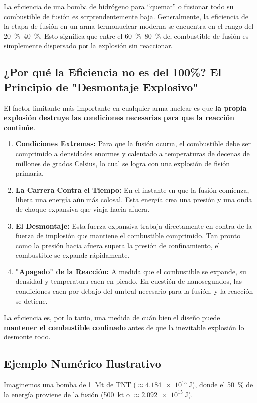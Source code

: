 \documentclass[11pt,a4paper]{book}
\begin{document}
La eficiencia de una bomba de hidrógeno para ``quemar'' o fusionar todo su combustible de fusión es sorprendentemente baja. Generalmente, la eficiencia de la etapa de fusión en un arma termonuclear moderna se encuentra en el rango del \SIrange{20}{40}{\percent}. Esto significa que entre el \SIrange{60}{80}{\percent} del combustible de fusión es simplemente dispersado por la explosión sin reaccionar.

\subsection*{¿Por qué la Eficiencia no es del 100\%? El Principio de "Desmontaje Explosivo"}

El factor limitante más importante en cualquier arma nuclear es que \textbf{la propia explosión destruye las condiciones necesarias para que la reacción continúe}.
\begin{enumerate}
    \item \textbf{Condiciones Extremas:} Para que la fusión ocurra, el combustible debe ser comprimido a densidades enormes y calentado a temperaturas de decenas de millones de grados Celsius, lo cual se logra con una explosión de fisión primaria.
    \item \textbf{La Carrera Contra el Tiempo:} En el instante en que la fusión comienza, libera una energía aún más colosal. Esta energía crea una presión y una onda de choque expansiva que viaja hacia afuera.
    \item \textbf{El Desmontaje:} Esta fuerza expansiva trabaja directamente en contra de la fuerza de implosión que mantiene el combustible comprimido. Tan pronto como la presión hacia afuera supera la presión de confinamiento, el combustible se expande rápidamente.
    \item \textbf{"Apagado" de la Reacción:} A medida que el combustible se expande, su densidad y temperatura caen en picado. En cuestión de nanosegundos, las condiciones caen por debajo del umbral necesario para la fusión, y la reacción se detiene.
\end{enumerate}
La eficiencia es, por lo tanto, una medida de cuán bien el diseño puede \textbf{mantener el combustible confinado} antes de que la inevitable explosión lo desmonte todo.

\subsection*{Ejemplo Numérico Ilustrativo}
Imaginemos una bomba de \SI{1}{\mega\tonne} de TNT ($\approx \SI{4.184e15}{\joule}$), donde el \SI{50}{\percent} de la energía proviene de la fusión (\SI{500}{\kilo\tonne} o $\approx \SI{2.092e15}{\joule}$).
\end{document}
